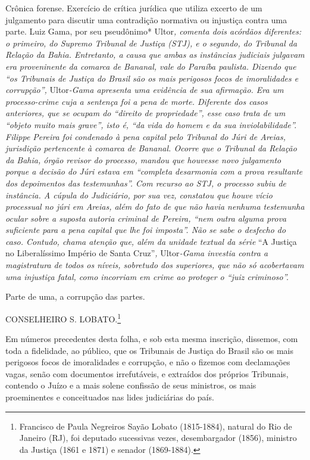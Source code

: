 \begin{didascalia}
Crônica forense. Exercício de crítica jurídica que utiliza excerto de um
julgamento para discutir uma contradição normativa ou injustiça contra
uma parte. Luiz Gama, por seu pseudônimo* Ultor\emph{, comenta dois
acórdãos diferentes: o primeiro, do Supremo Tribunal de Justiça (STJ), e
o segundo, do Tribunal da Relação da Bahia. Entretanto, a causa que
ambas as instâncias judiciais julgavam era proveninente da comarca de
Bananal, vale do Paraíba paulista. Dizendo que ``os Tribunais de Justiça
do Brasil são os mais perigosos focos de imoralidades e corrupção'',}
Ultor\emph{-Gama apresenta uma evidência de sua afirmação. Era um
processo-crime cuja a sentença foi a pena de morte. Diferente dos casos
anteriores, que se ocupam do ``direito de propriedade'', esse caso trata
de um ``objeto muito mais grave'', isto é, ``da vida do homem e da sua
inviolabilidade''. Filippe Pereira foi condenado à pena capital pelo
Tribunal do Júri de Areias, jurisdição pertencente à comarca de Bananal.
Ocorre que o Tribunal da Relação da Bahia, órgão revisor do processo,
mandou que houvesse novo julgamento porque a decisão do Júri estava em
``completa desarmonia com a prova resultante dos depoimentos das
testemunhas''. Com recurso ao STJ, o processo subiu de instância. A
cúpula do Judiciário, por sua vez, constatou que houve vício processual
no júri em Areias, além do fato de que não havia nenhuma testemunha
ocular sobre a suposta autoria criminal de Pereira, ``nem outra alguma
prova suficiente para a pena capital que lhe foi imposta''. Não se sabe o
desfecho do caso. Contudo, chama atenção que, além da unidade textual da
série} ``A Justiça no Liberalíssimo Império de Santa Cruz''\emph{,}
Ultor\emph{-Gama investia contra a magistratura de todos os níveis,
sobretudo dos superiores, que não só acobertavam uma injustiça fatal,
como incorriam em crime ao proteger o ``juiz criminoso''.}
\end{didascalia}

\asterisc{}

Parte de uma, a corrupção das partes.

CONSELHEIRO S. LOBATO.\footnote{Francisco de Paula Negreiros Sayão
  Lobato (1815-1884), natural do Rio de Janeiro (RJ), foi deputado
  sucessivas vezes, desembargador (1856), ministro da Justiça (1861 e
  1871) e senador (1869-1884).}

Em números precedentes desta folha, e sob esta mesma inscrição,
dissemos, com toda a fidelidade, ao público, que os Tribunais de Justiça
do Brasil são os mais perigosos focos de imoralidades e corrupção, e não
o fizemos com declamações vagas, senão com documentos irrefutáveis, e
extraídos dos próprios Tribunais, contendo o Juízo e a mais solene
confissão de seus ministros, os mais proeminentes e conceituados nas
lides judiciárias do país.

